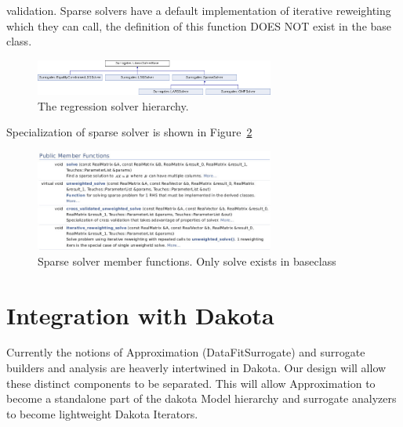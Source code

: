 \documentclass[dakotalogo]{dakota-article}
\begin{document}
validation. Sparse solvers have a default implementation of iterative
reweighting which they can call, the definition of this function DOES
NOT exist in the base class.
\begin{figure}[htb]\centering
\includegraphics[width=0.7\textwidth]{classSurrogates_1_1LinearSystemSolver.png}
\caption{The regression solver hierarchy.}
\label{fig:regresion-solver-inheritance}
\end{figure}
Specialization of sparse solver is shown in
Figure~\ref{fig:sparse-solver-members}
\begin{figure}[htb]\centering
\includegraphics[width=0.7\textwidth]{sparsesolverclass.jpeg}
\caption{Sparse solver member functions. Only solve exists in baseclass}
\label{fig:sparse-solver-members}
\end{figure}
\section{Integration with Dakota}
Currently the notions of Approximation (DataFitSurrogate) and surrogate builders and analysis are heaverly intertwined in Dakota. Our design will allow these distinct components to be separated. This will allow Approximation to become a standalone part of the dakota Model hierarchy and surrogate analyzers to become lightweight Dakota Iterators.



\end{document}
